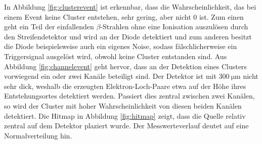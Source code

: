 In Abbildung \ref{fig:clusterevent} ist erkennbar, dass die Wahrscheinlichkeit, das bei einem Event keine Cluster entstehen, sehr gering, aber nicht 0 ist.
Zum einen geht ein Teil der einfallenden $\beta$-Strahlen ohne eine Ionisation auszulösen durch den Streifendetektor und wird an der Diode detektiert und zum anderen
besitzt die Diode beispielsweise auch ein eigenes Noise, sodass fälschlicherweise ein Triggersignal ausgelöst wird, obwohl keine Cluster entstanden sind.
Aus Abbildung \ref{fig:channelevent} geht hervor, dass an der Detektion eines Clusters vorwiegend ein oder zwei Kanäle beteiligt sind. Der Detektor ist mit
$\SI{300}{\micro\meter}$ nicht sehr dick, weshalb die erzeugten Elektron-Loch-Paare etwa auf der Höhe ihres Entstehungsortes detektiert werden. Passiert dies zentral zwischen
zwei Kanälen, so wird der Cluster mit hoher Wahrscheinlichkeit von diesen beiden Kanälen detektiert. Die Hitmap in Abbildung \ref{fig:hitmap} zeigt, dass die Quelle relativ zentral auf dem Detektor
plaziert wurde. Der Messwerteverlauf deutet auf eine Normalverteilung hin.

